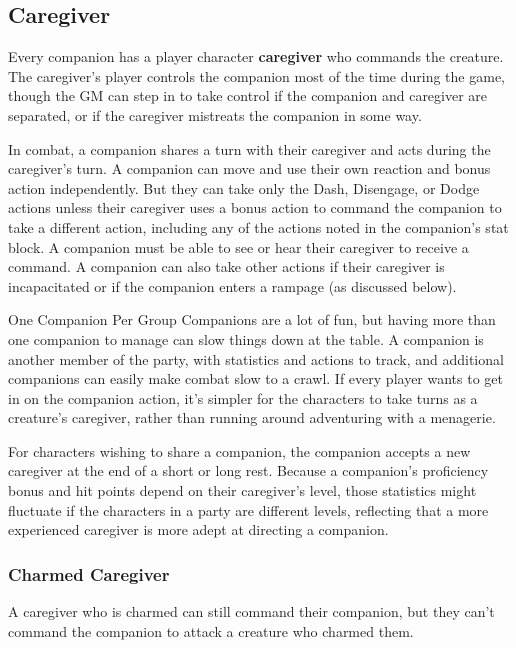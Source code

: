 \documentclass[10pt,a4paper,twoside,bg=print,twocolumn,openany,nodeprecatedcode]{dndbook}
\begin{document}
\subsection{Caregiver}
Every companion has a player character \textbf{caregiver} who commands the creature. The caregiver's player controls the companion most of the time during the game, though the GM can step in to take control if the companion and caregiver are separated, or if the caregiver mistreats the companion in some way.

In combat, a companion shares a turn with their caregiver and acts during the caregiver's turn. A companion can move and use their own reaction and bonus action independently. But they can take only the Dash, Disengage, or Dodge actions unless their caregiver uses a bonus action to command the companion to take a different action, including any of the actions noted in the companion's stat block. A companion must be able to see or hear their caregiver to receive a command. A companion can also take other actions if their caregiver is incapacitated or if the companion enters a rampage (as discussed below).

\begin{DndSidebar}[float=!b]{One Companion Per Group}
Companions are a lot of fun, but having more than one companion to manage can slow things down at the table. A companion is another member of the party, with statistics and actions to track, and additional companions can easily make combat slow to a crawl. If every player wants to get in on the companion action, it's simpler for the characters to take turns as a creature's caregiver, rather than running around adventuring with a menagerie.



For characters wishing to share a companion, the companion accepts a new caregiver at the end of a short or long rest. Because a companion's proficiency bonus and hit points depend on their caregiver's level, those statistics might fluctuate if the characters in a party are different levels, reflecting that a more experienced caregiver is more adept at directing a companion.



\end{DndSidebar}

\subsubsection{Charmed Caregiver}
A caregiver who is charmed can still command their companion, but they can't command the companion to attack a creature who charmed them.
\end{document}
